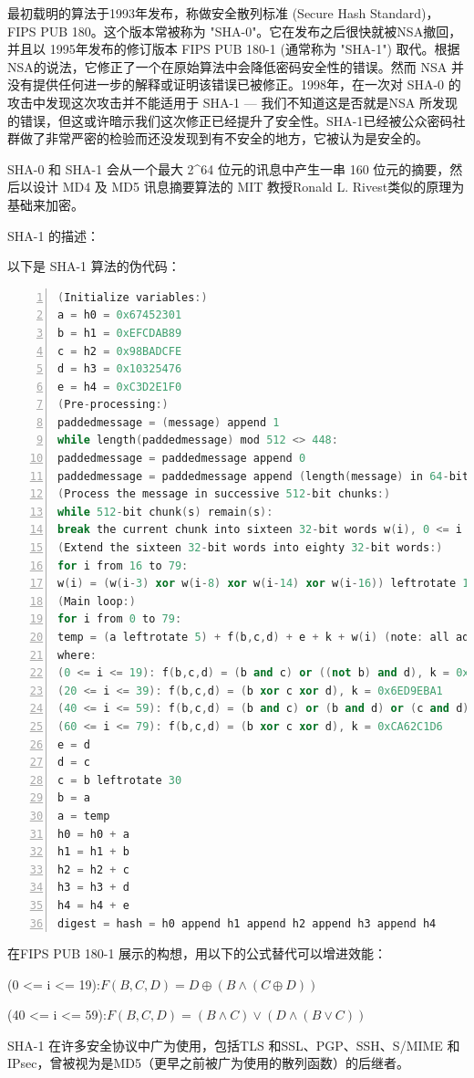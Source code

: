 \documentclass[UTF8,a4paper]{article}
\begin{document}
最初载明的算法于1993年发布，称做安全散列标准 (Secure Hash Standard)，FIPS PUB 180。这个版本常被称为 "SHA-0"。它在发布之后很快就被NSA撤回，并且以 1995年发布的修订版本 FIPS PUB 180-1 (通常称为 "SHA-1") 取代。根据 NSA的说法，它修正了一个在原始算法中会降低密码安全性的错误。然而 NSA 并没有提供任何进一步的解释或证明该错误已被修正。1998年，在一次对 SHA-0 的攻击中发现这次攻击并不能适用于 SHA-1 — 我们不知道这是否就是NSA 所发现的错误，但这或许暗示我们这次修正已经提升了安全性。SHA-1已经被公众密码社群做了非常严密的检验而还没发现到有不安全的地方，它被认为是安全的。


SHA-0 和 SHA-1 会从一个最大 2\^{}64 位元的讯息中产生一串 160 位元的摘要，然后以设计 MD4 及 MD5 讯息摘要算法的 MIT 教授Ronald L. Rivest类似的原理为基础来加密。


SHA-1 的描述：


以下是 SHA-1 算法的伪代码：




\begin{lstlisting}[language = C++, numbers=left, 
numberstyle=\tiny,keywordstyle=\color{blue!70},
commentstyle=\color{red!50!green!50!blue!50},frame=shadowbox,
rulesepcolor=\color{red!20!green!20!blue!20},basicstyle=\small\ttfamily]
(Initialize variables:)
a = h0 = 0x67452301
b = h1 = 0xEFCDAB89
c = h2 = 0x98BADCFE
d = h3 = 0x10325476
e = h4 = 0xC3D2E1F0
(Pre-processing:)
paddedmessage = (message) append 1
while length(paddedmessage) mod 512 <> 448:
paddedmessage = paddedmessage append 0
paddedmessage = paddedmessage append (length(message) in 64-bit format)
(Process the message in successive 512-bit chunks:)
while 512-bit chunk(s) remain(s):
break the current chunk into sixteen 32-bit words w(i), 0 <= i <= 15
(Extend the sixteen 32-bit words into eighty 32-bit words:)
for i from 16 to 79:
w(i) = (w(i-3) xor w(i-8) xor w(i-14) xor w(i-16)) leftrotate 1
(Main loop:)
for i from 0 to 79:
temp = (a leftrotate 5) + f(b,c,d) + e + k + w(i) (note: all addition is mod 2^32)
where:
(0 <= i <= 19): f(b,c,d) = (b and c) or ((not b) and d), k = 0x5A827999
(20 <= i <= 39): f(b,c,d) = (b xor c xor d), k = 0x6ED9EBA1
(40 <= i <= 59): f(b,c,d) = (b and c) or (b and d) or (c and d), k = 0x8F1BBCDC
(60 <= i <= 79): f(b,c,d) = (b xor c xor d), k = 0xCA62C1D6
e = d
d = c
c = b leftrotate 30
b = a
a = temp
h0 = h0 + a
h1 = h1 + b
h2 = h2 + c
h3 = h3 + d
h4 = h4 + e
digest = hash = h0 append h1 append h2 append h3 append h4

\end{lstlisting}\par 
在FIPS PUB 180-1 展示的构想，用以下的公式替代可以增进效能：\par 
\begin{center}
	(0 <= i <= 19):$ 
	F(B,C,D)=D\oplus (B\wedge(C\oplus D))
	$\par 	
	
	(40 <= i <= 59):$ 
	F(B,C,D)=(B\wedge C)\vee(D\wedge(B\vee C))
	$\par 
\end{center}
SHA-1 在许多安全协议中广为使用，包括TLS 和SSL、PGP、SSH、S/MIME
和IPsec，曾被视为是MD5（更早之前被广为使用的散列函数）的后继者。\par 
\end{document}
